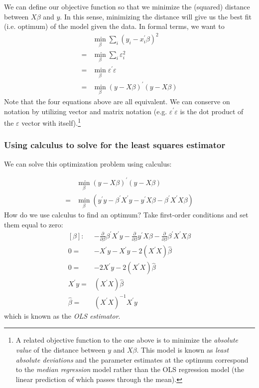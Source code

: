 \documentclass[12pt,english]{article}
\begin{document}
We can define our objective function so that we minimize the (squared) distance between $X\beta$ and $y$. In this sense, minimizing the distance will give us the best fit (i.e. optimum) of the model given the data. In formal terms, we want to
\begin{align}
 & \min_{\beta}\sum_{i}\left(y_{i}-x_{i}^{\prime}\beta\right)^{2}\nonumber \\
= & \min_{\beta}\sum_{i}\varepsilon_{i}^{2}\nonumber \\
= & \min_{\beta}\varepsilon^{\prime}\varepsilon\label{eq:3}\\
= & \min_{\beta}\left(y-X\beta\right)^{\prime}\left(y-X\beta\right)\nonumber 
\end{align}
Note that the four equations above are all equivalent. We can conserve on notation by utilizing vector and matrix notation (e.g. $\varepsilon^{\prime}\varepsilon$ is the dot product of the $\varepsilon$ vector with itself).\footnote{A related objective function to the one above is to minimize the \emph{absolute value} of the distance between $y$ and $X\beta$. This model is known as \emph{least absolute deviations} and the parameter estimates at the optimum correspond to the \emph{median regression} model rather than the OLS regression model (the linear prediction of which passes through the mean).}

\subsubsection{Using calculus to solve for the least squares estimator}

We can solve this optimization problem using calculus:

\begin{align*}
 & \min_{\beta}\left(y-X\beta\right)^{\prime}\left(y-X\beta\right)\\
    = & \min_{\beta}\left(y^{\prime}y-\beta^{\prime}X^{\prime}y-y^{\prime}X\beta-\beta^{\prime}X^{\prime}X\beta\right)
\end{align*}
How do we use calculus to find an optimum? Take first-order conditions and set them equal to zero:
\begin{align}
\left[\beta\right]: & -\frac{\partial}{\partial\beta}\beta^{\prime}X^{\prime}y-\frac{\partial}{\partial\beta}y^{\prime}X\beta-\frac{\partial}{\partial\beta}\beta^{\prime}X^{\prime}X\beta\label{eq:4}\\
0= & -X^{\prime}y-X^{\prime}y-2\left(X^{\prime}X\right)\hat{\beta}\nonumber \\
0= & -2X^{\prime}y-2\left(X^{\prime}X\right)\hat{\beta}\nonumber \\
X^{\prime}y= & \left(X^{\prime}X\right)\hat{\beta}\nonumber \\
\hat{\beta}= & \left(X^{\prime}X\right)^{-1}X^{\prime}y\nonumber 
\end{align}
which is known as the \emph{OLS estimator}.
\end{document}
